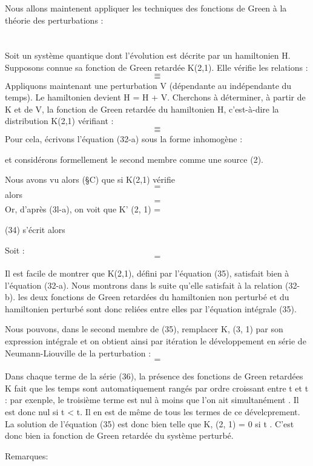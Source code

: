 Nous allons maintenent appliquer les techniques des fonctions
de Green à la théorie des perturbations :

\section{}%

Soit un système quantique dont l'évolution est décrite par un
hamiltonien H. Supposons connue sa fonction de Green retardée K(2,1).
Elle vérifie les relations :
\[
\tag{31-a}=
\]
\[
\tag{31-b}=
\]
Appliquons maintenant une perturbation V (dépendante au indépendante du
temps). Le hamiltonien devient H = H + V. Cherchons à déterminer, à partir
de K et de V, la fonction de Green retardée du hamiltonien H, c'est-à-dire
la distribution K(2,1) vérifiant :
\[
\tag{32-a}=
\]
\[
\tag{32-b}=
\]
Pour cela, écrivons l'équation (32-a) sous la forme inhomogène :

et considérons formellement le second membre comme une source  (2).


Nous avons vu alors (\S C) que si K(2,1) vérifie
\[
\tag{33}=
\]
alors
\[
\tag{34}=
\]
Or, d'après (3l-a), on voit que K' (2, 1) =

(34) s'écrit alors

Soit :
\[
\tag{35}=
\]

Il est facile de montrer que K(2,1), défini par l'équation (35),
satisfait bien à l'équation (32-a). Nous montrons dans ls suite qu'elle
satisfait à la relation (32-b). les deux fonctions de Green retardées
du hamiltonien non perturbé et du hamiltonien perturbé sont donc reliées
entre elles par l'équation intégrale (35).

Nous pouvons, dans le second membre de (35), remplacer K, (3, 1)
par son expression intégrale et on obtient ainsi par itération le développement
en série de Neumann-Liouville de la perturbation :
\[
\tag{36}=
\]

Dans chaque terme de la série (36), la présence des fonctions de
Green retardées K fait que les temps sont automatiquement rangés par
ordre croissant entre t et t : par exenple, le troisième terme est nul
à moins que l'on ait simultanément . Il est donc
nul si t < t. Il en est de même de tous les termes de ce dévelcprement.
La solution de l'équation (35) est donc bien telle que K, (2, 1) = 0 si
t . C'est donc bien ia fonction de Green retardée du système perturbé.

Remarques:

